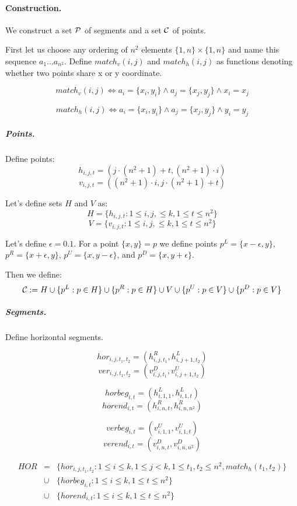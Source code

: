 \paragraph{Construction.}
We construct a set $\mathcal{P}$ of segments and a set $\mathcal{C}$
of points.

First let us choose any ordering of $n^2$ elements
$\{1,n\} \times \{1,n\}$ and name this sequence $a_1 \ldots a_{n^2}$.
Define $match_v(i, j)$ and $match_h(i, j)$
as functions denoting whether two points share x or y coordinate.

$$match_v(i, j) \iff
a_i = \{x_i, y_i\} \land a_j = \{x_j, y_j\} \land x_i = x_j$$

$$match_h(i, j) \iff
a_i = \{x_i, y_i\} \land a_j = \{x_j, y_j\} \land y_i = y_j$$


\subparagraph{Points.}

Define points:
	$$h_{i, j, t} = (j \cdot (n^2+1) + t, (n^2+1) \cdot i)$$
	$$v_{i, j, t} = ((n^2+1) \cdot i, j \cdot (n^2+1) + t)$$
	
Let's define sets $H$ and $V$ as:
$$H = \{h_{i, j, t} : 1 \le i, j, \le k, 1 \le t \le n^2\}$$
$$V = \{v_{i, j, t} : 1 \le i, j, \le k, 1 \le t \le n^2\}$$
	
Let's define $\epsilon = 0.1$.
For a point $\{x, y\} = p$ we define points
$p^{L} = \{x - \epsilon, y\}$,
$p^{R} = \{x + \epsilon, y\}$,
$p^{U} = \{x, y - \epsilon\}$,
and $p^{D} = \{x, y + \epsilon\}$.

Then we define:
$$\mathcal{C} := H \cup \{p^L : p \in H\} \cup \{p^R : p \in H\}
\cup V \cup \{p^U : p \in V\} \cup \{p^D : p \in V\} $$


\subparagraph{Segments.}
Define horizontal segments.

$$hor_{i, j, t_1, t_2} = (h^R_{i,j,t_1}, h^L_{i, j+1, t_2})$$
$$ver_{i, j, t_1, t_2} = (v^D_{i,j,t_1}, v^U_{i, j+1, t_2})$$

$$horbeg_{i, t} = (h^L_{i, 1, 1}, h^L_{i, 1, t})$$
$$horend_{i, t} = (h^R_{i, n, t}, h^R_{i, n, n^2})$$


$$verbeg_{i, t} = (v^U_{i, 1, 1}, v^U_{i, 1, t})$$
$$verend_{i, t} = (v^D_{i, n, t}, v^D_{i, n, n^2})$$

\begin{eqnarray*}
HOR &= &\{hor_{i, j, t_1, t_2} : 1 \le i \le k, 1 \le j < k,
1 \le t_1, t_2 \le n^2, match_h(t_1, t_2)\} \\
&\cup &\{horbeg_{i,t} : 1 \le i \le k, 1 \le t \le n^2\}
\\
&\cup &\{horend_{i,t} : 1 \le i \le k, 1 \le t \le n^2\}
\end{eqnarray*}

